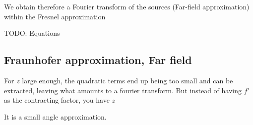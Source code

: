 \documentclass[../main/main.tex]{subfiles}
\begin{document}
We obtain therefore a Fourier transform of the sources (Far-field approximation) within the Fresnel approximation

TODO: Equations

\subsection{Fraunhofer approximation, Far field}

For $z$ large enough, the quadratic terms end up being too small and can be extracted, leaving what amounts to a fourier transform. But instead of having $f'$ as the contracting factor, you have $z$




It is a small angle approximation\cite{wiki:Fraunhofer_diffraction}.

\chapterreferences
\end{document}
